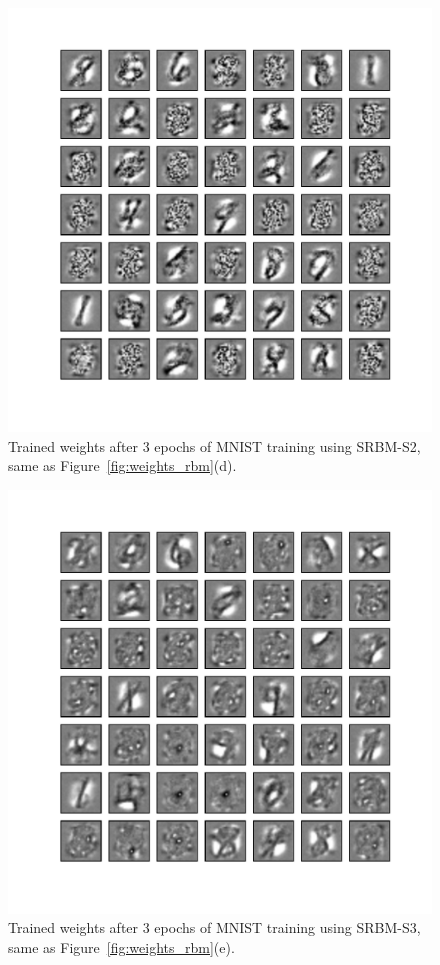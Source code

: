 \begin{figure}
	\centering
	\includegraphics[width=\textwidth]{pics_sdlm/52_MNIST_SRBM_noise/2_60000_0.pdf}
	\caption[Trained weights of SRBM-S2, same as Figure~\ref{fig:weights_rbm}(d).]{Trained weights after 3 epochs of MNIST training using SRBM-S2, same as Figure~\ref{fig:weights_rbm}(d).}
	\label{fig:weights_rbm4}
\end{figure}

\begin{figure}
	\centering
	\includegraphics[width=\textwidth]{pics_sdlm/51_MNIST_SRBM_teach/2_60000_0.pdf}
	\caption[Trained weights of SRBM-S3, same as Figure~\ref{fig:weights_rbm}(e).]{Trained weights after 3 epochs of MNIST training using SRBM-S3, same as Figure~\ref{fig:weights_rbm}(e).}
	\label{fig:weights_rbm5}
\end{figure}

